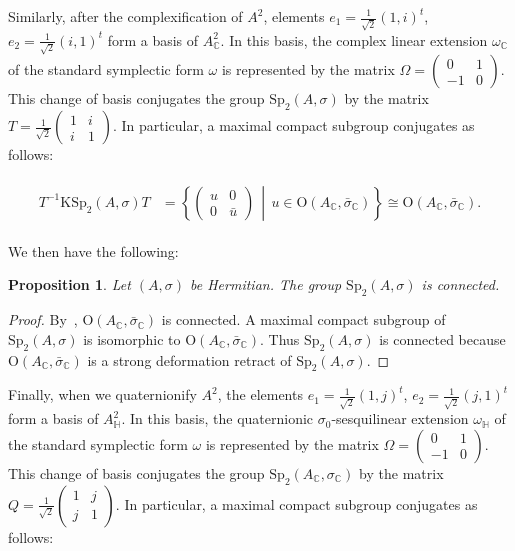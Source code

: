 \documentclass[oneside,11pt]{amsart}
\newtheorem{prop}[thm]{Proposition}
\theoremstyle{definition}
\theoremstyle{remark}
\newcommand{\midwd}{\,\middle\vert\,}
\numberwithin{thm}{section}
\numberwithin{equation}{section}
\begin{document}
Similarly, after the complexification of $A^2$, elements $e_1=\frac{1}{\sqrt{2}}(1,i)^t$, $e_2=\frac{1}{\sqrt{2}}(i,1)^t$ form a basis of $A_\mathbb C^2$. In this basis, the complex linear extension $\omega_{\mathbb C}$ of the standard symplectic form $\omega$ is represented by the matrix $\Omega=\begin{pmatrix}
    0 & 1 \\
    -1 & 0
\end{pmatrix}$. This change of basis conjugates the group $\mathrm{Sp}_{2}(A,\sigma)$ by the matrix $T=\frac{1}{\sqrt{2}}\begin{pmatrix}
    1 & i \\
    i & 1
\end{pmatrix}$. In particular, a maximal compact subgroup conjugates as follows:

\begin{align}\label{eq:conj_symp_real}
\begin{aligned}
     T^{-1}\mathrm{KSp}_{2}(A,\sigma)T&=\left\{\begin{pmatrix}
    u & 0 \\
    0 & \bar u
    \end{pmatrix}\midwd u\in \mathrm{O}{(A_\mathbb C,\bar\sigma_{\mathbb C})}\right\}\cong \mathrm O{(A_\mathbb C,\bar\sigma_{\mathbb C})}.
\end{aligned}
\end{align}

We then have the following:
\begin{prop}\label{prop:Sp_2-connected}
    Let $(A,\sigma)$ be Hermitian. The group $\mathrm{Sp}_{2}(A,\sigma)$ is connected.
\end{prop}

\begin{proof}
    By~\cite[Corollary~2.7.24]{Rog}, $\mathrm{O}{(A_\mathbb C,\bar\sigma_\mathbb C)}$ is connected. A maximal compact subgroup of $\mathrm{Sp}_{2}(A,\sigma)$ is isomorphic to $\mathrm{O}{(A_\mathbb C,\bar\sigma_\mathbb C)}$. Thus $\mathrm{Sp}_{2}(A,\sigma)$ is connected because $\mathrm{O}{(A_\mathbb C,\bar\sigma_\mathbb C)}$ is a strong deformation retract of $\mathrm{Sp}_{2}(A,\sigma)$.
\end{proof}

Finally, when we quaternionify $A^2$, the elements $e_1=\frac{1}{\sqrt{2}}(1,j)^t$, $e_2=\frac{1}{\sqrt{2}}(j,1)^t$ form a basis of $A_\mathbb H^2$. In this basis, the quaternionic $\sigma_0$-sesquilinear extension $\omega_{\mathbb H}$ of the standard symplectic form $\omega$ is represented by the matrix $\Omega=\begin{pmatrix}
    0 & 1 \\
    -1 & 0
\end{pmatrix}$. This change of basis conjugates the group $\mathrm{Sp}_{2}(A_\mathbb C,\sigma_\mathbb C)$ by the matrix $Q=\frac{1}{\sqrt{2}}\begin{pmatrix}
    1 & j \\
    j & 1
\end{pmatrix}$. In particular, a maximal compact subgroup conjugates as follows:
\end{document}
